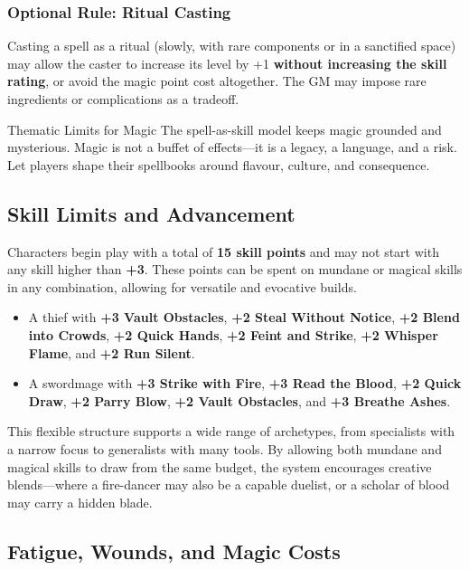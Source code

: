 \subsubsection*{Optional Rule: Ritual Casting}

Casting a spell as a ritual (slowly, with rare components or in a sanctified space) may allow the caster to increase its level by +1 \textbf{without increasing the skill rating}, or avoid the magic point cost altogether. The GM may impose rare ingredients or complications as a tradeoff.

\begin{CommentBox}{Thematic Limits for Magic}
    The spell-as-skill model keeps magic grounded and mysterious. Magic is not a buffet of effects—it is a legacy, a language, and a risk. Let players shape their spellbooks around flavour, culture, and consequence.
\end{CommentBox}

\subsection{Skill Limits and Advancement}

Characters begin play with a total of \textbf{15 skill points} and may not start with any skill higher than \textbf{+3}. These points can be spent on mundane or magical skills in any combination, allowing for versatile and evocative builds.

\begin{itemize}\raggedright
    \item A thief with \textbf{+3 Vault Obstacles}, \textbf{+2 Steal Without Notice}, \textbf{+2 Blend into Crowds}, \textbf{+2 Quick Hands}, \textbf{+2 Feint and Strike}, \textbf{+2 Whisper Flame}, and \textbf{+2 Run Silent}.
    
    \item A swordmage with \textbf{+3 Strike with Fire}, \textbf{+3 Read the Blood}, \textbf{+2 Quick Draw}, \textbf{+2 Parry Blow}, \textbf{+2 Vault Obstacles}, and \textbf{+3 Breathe Ashes}.
\end{itemize}

This flexible structure supports a wide range of archetypes, from specialists with a narrow focus to generalists with many tools. By allowing both mundane and magical skills to draw from the same budget, the system encourages creative blends—where a fire-dancer may also be a capable duelist, or a scholar of blood may carry a hidden blade.

\subsection{Fatigue, Wounds, and Magic Costs}

